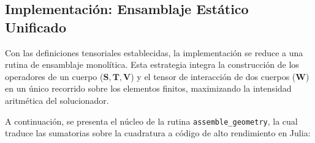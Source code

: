 \subsection{Implementación: Ensamblaje Estático Unificado}

Con las definiciones tensoriales establecidas, la implementación se reduce a una rutina de ensamblaje monolítica. Esta estrategia integra la construcción de los operadores de un cuerpo (\(\mathbf{S}, \mathbf{T}, \mathbf{V}\)) y el tensor de interacción de dos cuerpos (\(\mathbf{W}\)) en un único recorrido sobre los elementos finitos, maximizando la intensidad aritmética del solucionador.

A continuación, se presenta el núcleo de la rutina \texttt{assemble\_geometry}, la cual traduce las sumatorias sobre la cuadratura a código de alto rendimiento en Julia:

